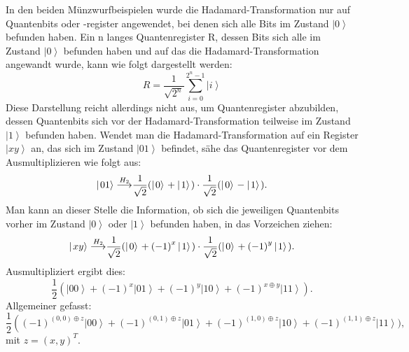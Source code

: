 In den beiden Münzwurfbeispielen wurde die Hadamard-Transformation nur auf Quantenbits oder -register angewendet, bei denen sich alle Bits im Zustand $\left|0\right\rangle$ befunden haben. Ein n langes Quantenregister R, dessen Bits sich alle im Zustand $\left|0\right\rangle$ befunden haben und auf das die Hadamard-Transformation angewandt wurde, kann wie folgt dargestellt werden:
$$R=\frac{1}{\sqrt{2^n}}\sum_{i=0}^{2^n-1}\left|\left.i\right\rangle\right.$$
Diese Darstellung reicht allerdings nicht aus, um Quantenregister abzubilden, dessen Quantenbits sich vor der Hadamard-Transformation teilweise im Zustand $\left|1\right\rangle$ befunden haben. Wendet man die Hadamard-Transformation auf ein Register $\left|xy\right\rangle$ an, das sich im Zustand $\left|01\right\rangle$ befindet, sähe das Quantenregister vor dem Ausmultiplizieren wie folgt aus:
$$\left|\left.01\right\rangle\right.{\buildrel H_2\over\longrightarrow}\frac{1}{\sqrt2}(\left|\left.0\right\rangle\right.+\left|\left.1\right\rangle\right.)\cdot\frac{1}{\sqrt2}(\left|\left.0\right\rangle\right.-\left|\left.1\right\rangle\right.).$$
Man kann an dieser Stelle die Information, ob sich die jeweiligen Quantenbits vorher im Zustand $\left|0\right\rangle$ oder $\left|1\right\rangle$ befunden haben, in das Vorzeichen ziehen:
$$\left|\left.xy\right\rangle\right.{\buildrel H_2\over\longrightarrow}\frac{1}{\sqrt2}(\left|\left.0\right\rangle\right.+{(-1)}^x\left|\left.1\right\rangle\right.)\cdot\frac{1}{\sqrt2}(\left|\left.0\right\rangle\right.+{(-1)}^y\left|\left.1\right\rangle\right.).$$
Ausmultipliziert ergibt dies: 
$$\frac{1}{2}\left(\left|\left.00\right\rangle\right.+\left(-1\right)^x\left|\left.01\right\rangle\right.+\left(-1\right)^y\left|\left.10\right\rangle\right.+\left(-1\right)^{x\oplus y}\left|\left.11\right\rangle\right.\right).$$
Allgemeiner gefasst:
$$\frac{1}{2}\left(\left(-1\right)^{\left(0,0\right)\oplus z}\left|\left.00\right\rangle\right.+\left(-1\right)^{\left(0,1\right)\oplus z}\left|\left.01\right\rangle\right.+\left(-1\right)^{\left(1,0\right)\oplus z}\left|\left.10\right\rangle\right.+\left(-1\right)^{\left(1,1\right)\oplus z}\left|\left.11\right\rangle\right.\right.),$$
mit $z={(x,y)}^T$.

